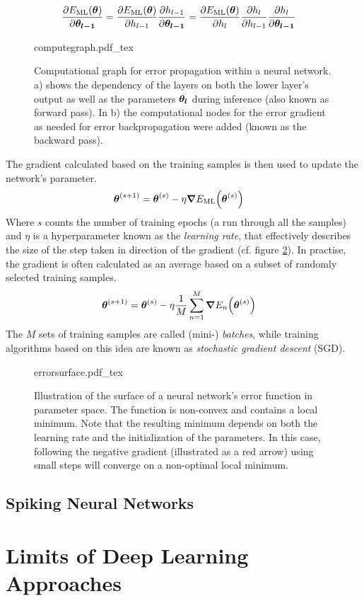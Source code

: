 \begin{align}
    \pdv{E_{\mathrm{ML}}\qty(\vb*{\theta})}{\vb*{\theta_{l-1}}} &= \pdv{E_{\mathrm{ML}}\qty(\vb*{\theta})}{h_{l-1}} \pdv{h_{l-1}}{\vb*{\theta_{l-1}}} = \pdv{E_{\mathrm{ML}}\qty(\vb*{\theta})}{h_l}\pdv{h_l}{h_{l-1}} \pdv{h_l}{\vb*{\theta_{l-1}}}
\end{align}
\begin{figure}
    \centering
\def\svgwidth{\textwidth}
{computegraph.pdf_tex}
\caption[Computational graph for error propagation]{Computational graph for error propagation within a neural network. a) shows the dependency of the layers on both the lower layer's output as well as the parameters $\vb*{\theta_l}$ during inference (also known as forward pass). In b) the computational nodes for the error gradient as needed for error backpropagation were added (known as the backward pass).}\label{fig:computegraph}
\end{figure}\noindent
The gradient calculated based on the training samples is then used to update the network's parameter.
\begin{align}
    \vb*{\theta}^{(s+1)} &= \vb*{\theta}^{(s)}-\eta \grad{E_{\mathrm{ML}}\qty(\vb*{\theta}^{(s)})}
\end{align}
Where $s$ counts the number of training epochs (a run through all the samples) and $\eta$ is a hyperparameter known as the \emph{learning rate}, that effectively describes the size of the step taken in direction of the gradient (cf. figure \ref{fig:errorsurf}). In practise, the gradient is often calculated as an average based on a subset of randomly selected training samples.
\begin{align}
    \vb*{\theta}^{(s+1)} &= \vb*{\theta}^{(s)}-\eta\frac{1}{M} \sum_{n=1}^M\grad{E_n\qty(\vb*{\theta}^{(s)})}
\end{align}
The $M$ sets of training samples are called (mini-) \emph{batches}, while training algorithms based on this idea are known as \emph{stochastic gradient descent} (SGD).
\begin{figure}
    \centering
\def\svgwidth{.5\textwidth}
{errorsurface.pdf_tex}
\caption[Illustration of a neural network's error function]{Illustration of the surface of a neural network's error function in parameter space. The function is non-convex and contains a local minimum. Note that the resulting minimum depends on both the learning rate and the initialization of the parameters. In this case, following the negative gradient (illustrated as a red arrow) using small steps will converge on a non-optimal local minimum.}\label{fig:errorsurf}
\end{figure}\noindent
\subsection{Spiking Neural Networks}
\section{Limits of Deep Learning Approaches}